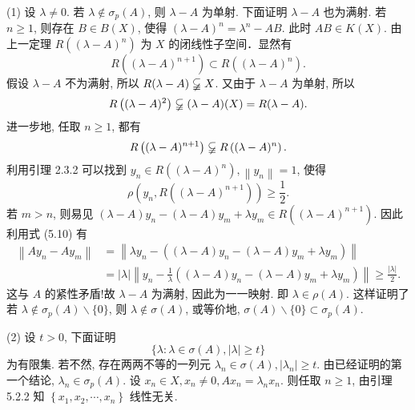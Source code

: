 \documentclass[openany]{ctexbook}
\makeatletter
\theoremstyle{kaiti}
\theoremstyle{normal}
\renewenvironment{proof}[1][\proofname]{\par
    \pushQED{\qed}%
    \normalfont \topsep6\p@\@plus6\p@\relax
    \trivlist
    \item\relax
    {\heiti #1}\hspace{2\labelsep}\ignorespaces
  }{%
    \popQED\endtrivlist\@endpefalse
  }
\makeatother
\begin{document}
\begin{proof}
(1) 设 $\lambda \neq 0$. 若 $\lambda \notin \sigma_{p}(A)$, 则 $\lambda-A$ 为单射. 下面证明 $\lambda-A$ 也为满射. 若 $n \geqslant 1$, 则存在 $B \in B(X)$, 使得 $(\lambda-A)^n=\lambda^n-A B$. 此时 $A B \in K(X)$. 由上一定理 $R\left((\lambda-A)^n\right)$ 为 $X$ 的闭线性子空间．显然有
$$
R\left((\lambda-A)^{n+1}\right) \subset R\left((\lambda-A)^n\right).
$$
假设 $\lambda-A$ 不为满射, 所以 $R(\lambda-A) \varsubsetneqq X$. 又由于 $\lambda-A$ 为单射, 所以
$$
R\left((\lambda-A)^2\right) \varsubsetneqq(\lambda-A)(X)=R(\lambda-A).
$$
进一步地, 任取 $n \geqslant 1$, 都有
$$
R\left((\lambda-A)^{n+1}\right) \varsubsetneqq R\left((\lambda-A)^n\right).
$$
利用引理 2.3.2 可以找到 $y_n \in R\left((\lambda-A)^n\right),\left\|y_n\right\|=1$, 使得
\begin{equation}
  \rho\left(y_n, R\left((\lambda-A)^{n+1}\right)\right) \geqslant \frac{1}{2}.
\end{equation}
若 $m>n$, 则易见 $(\lambda-A) y_n-(\lambda-A) y_m+\lambda y_m \in R\left((\lambda-A)^{n+1}\right)$. 因此利用式 (5.10) 有
$$
\begin{aligned}
\left\|A y_n-A y_m\right\| &=\left\|\lambda y_n-\left((\lambda-A) y_n-(\lambda-A) y_m+\lambda y_m\right)\right\| \\
&=|\lambda|\left\|y_n-\frac{1}{\lambda}\left((\lambda-A) y_n-(\lambda-A) y_m+\lambda y_m\right)\right\| \geqslant \frac{|\lambda|}{2}.
\end{aligned}
$$
这与 $A$ 的紧性矛盾!故 $\lambda-A$ 为满射, 因此为一一映射. 即 $\lambda \in \rho(A)$. 这样证明了若 $\lambda \notin \sigma_{p}(A) \backslash\{0\}$, 则 $\lambda \notin \sigma(A)$, 或等价地, $\sigma(A) \backslash\{0\} \subset \sigma_{p}(A)$.

(2) 设 $t>0$, 下面证明
$$
\{\lambda: \lambda \in \sigma(A),|\lambda| \geqslant t\}
$$
为有限集. 若不然, 存在两两不等的一列元 $\lambda_n \in \sigma(A),\left|\lambda_n\right| \geqslant t$. 由已经证明的第一个结论, $\lambda_n \in \sigma_{p}(A)$. 设 $x_n \in X, x_n \neq 0, A x_n=\lambda_n x_n$. 则任取 $n \geqslant 1$, 由引理 5.2.2 知 $\left\{x_1, x_2, \cdots, x_n\right\}$ 线性无关.


\end{proof}
\end{document}
